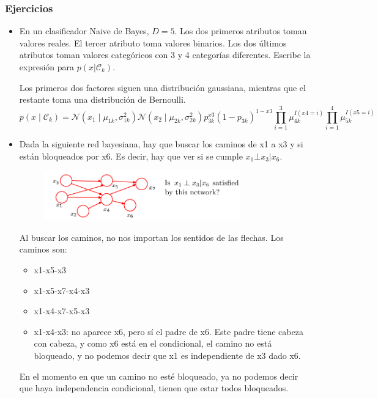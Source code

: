 \subsubsection{Ejercicios}
\begin{itemize}
\item En un clasificador Naive de Bayes, $D = 5$. Los dos primeros atributos toman valores reales. El tercer atributo toma valores binarios. Los dos últimos atributos toman valores categóricos con 3 y 4 categorías diferentes. Escribe la expresión para $p(x|\mathcal{C}_k )$.

Los primeros dos factores siguen una distribución gaussiana, mientras que el restante toma una distribución de Bernoulli. 
$$p(x \mid \mathcal{C}_k) = \mathcal{N}(x_1 \mid \mu_{1k}, \sigma_{1k}^2) \mathcal{N}(x_2 \mid \mu_{2k}, \sigma_{2k}^2) p_{3k}^{x3} (1 - p_{3k})^{1-x3} \prod^3_{i = 1} \mu_{4k}^{I(x4=i)}  \prod^4_{i = 1} \mu_{5k}^{I(x5=i)}$$

\item Dada la siguiente red bayesiana, hay que buscar los caminos de x1 a x3 y si están bloqueados por x6. Es decir, hay que ver si se cumple $x_1 \bot x_3|x_6$.

\begin{figure}[h]
\centering
\includegraphics[width = 0.8\textwidth]{figs/bayesian-network-exercise.png}
\end{figure}

Al buscar los caminos, no nos importan los sentidos de las flechas. Los caminos son:
\begin{itemize}
\item x1-x5-x3
\item x1-x5-x7-x4-x3
\item x1-x4-x7-x5-x3
\item x1-x4-x3: no aparece x6, pero sí el padre de x6. Este padre tiene cabeza con cabeza, y como x6 está en el condicional, el camino no está bloqueado, y no podemos decir que x1 es independiente de x3 dado x6.
\end{itemize}
En el momento en que un camino no esté bloqueado, ya no podemos decir que haya independencia condicional, tienen que estar todos bloqueados.
\end{itemize}

